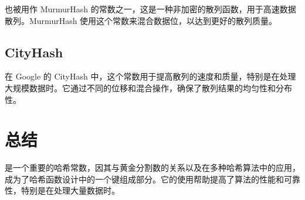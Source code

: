  也被用作 MurmurHash 的常数之一，这是一种非加密的散列函数，用于高速数据散列。MurmurHash 使用这个常数来混合数据位，以达到更好的散列质量。

\subsection{CityHash}

在 Google 的 CityHash 中，这个常数用于提高散列的速度和质量，特别是在处理大规模数据时。它通过不同的位移和混合操作，确保了散列结果的均匀性和分布性。

\section{总结}

 是一个重要的哈希常数，因其与黄金分割数的关系以及在多种哈希算法中的应用，成为了哈希函数设计中的一个键组成部分。它的使用帮助提高了算法的性能和可靠性，特别是在处理大量数据时。

